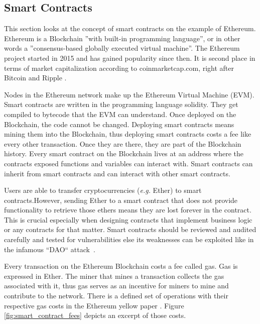 \subsection{Smart Contracts}
\label{subsec:02_smart_contracts}

This section looks at the concept of smart contracts on the example of Ethereum.
Ethereum is a Blockchain ''with built-in programming language'', or in other words a ''consensus-based globally executed virtual machine''.
The Ethereum project started in 2015 and has gained popularity since then. It is second place in terms of market capitalization according to coinmarketcap.com, right after Bitcoin and Ripple \cite{coinmarketcap}.

Nodes in the Ethereum network make up the Ethereum Virtual Machine (EVM). Smart contracts are written in the programming language solidity. They get compiled to bytecode that the EVM can understand.
Once deployed on the Blockchain, the code cannot be changed. Deploying smart contracts means mining them into the Blockchain, thus deploying smart contracts costs a fee like every other transaction. Once they are there, they are part of the Blockchain history. Every smart contract on the Blockchain lives at an address where the contracts exposed functions and variables can interact with. Smart contracts can inherit from smart contracts and can interact with other smart contracts.

Users are able to transfer cryptocurrencies (\textit{e.g.} Ether) to smart contracts.However, sending Ether to a smart contract that does not provide functionality to retrieve those ethers means they are lost forever in the contract. This is crucial especially when designing contracts that implement business logic or any contracts for that matter. Smart contracts should be reviewed and audited carefully and tested for vulnerabilities else its weaknesses can be exploited like in the infamous ``DAO`` attack~\cite{DoaAttack}.

Every transaction on the Ethereum Blockchain costs a fee called gas. Gas is expressed in Ether. The miner that mines a transaction collects the gas associated with it, thus gas serves as an incentive for miners to mine and contribute to the network. There is a defined set of operations with their respective gas costs in the Ethereum yellow paper \cite{ethereumyellowpaer}.
Figure \ref{fig:smart_contract_fees} depicts an excerpt of those costs.

